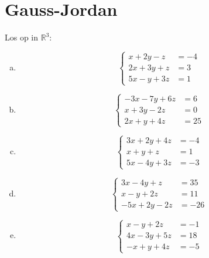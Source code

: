 \documentclass[12pt,twoside]{article}
\begin{document}
\pagebreak
\section{Gauss-Jordan}

\begin{oefening}
Los op in $\mathbb{R}^3$:
\begin{multicols}{2}
\begin{enumerate}[(a)]
  \item$$\left\{
\begin{aligned}
  x + 2y -z &= -4\\
  2x+3y+z   &= 3\\
  5x-y+3z   &= 1
\end{aligned}\right.$$
  \item$$\left\{
\begin{aligned}
  -3x -7y +6z &= 6\\
  x+3y-2z   &= 0\\
  2x+y+4z   &= 25
\end{aligned}\right.$$
  \item$$\left\{
\begin{aligned}
  3x +2y +4z &= -4\\
  x+y+z   &= 1\\
  5x-4y+3z   &= -3
\end{aligned}\right.$$
  \item$$\left\{
\begin{aligned}
  3x -4y +z &= 35\\
  x-y+2z   &= 11\\
  -5x+2y-2z   &= -26
\end{aligned}\right.$$
  \item$$\left\{
\begin{aligned}
  x -y + 2z &= -1\\
  4x-3y+5z   &= 18\\
  -x+y+4z   &= -5
\end{aligned}\right.$$
\end{enumerate}
\end{multicols}
\end{oefening}
\end{document}

